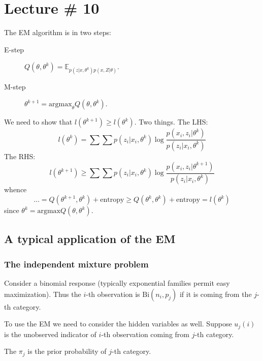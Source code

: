 \documentclass[a4paper]{article}
\newcommand{\brac}[1]{{\left ( #1 \right )}}
\newcommand{\Ex}[0]{{\mathbb{E}}}
\begin{document}




\clearpage
\section{Lecture \# 10} %
\label{sec:lecture_10}

The EM algorithm is in two steps: \begin{description}
	\item[E-step] $Q\brac{\theta, \theta^k} = \Ex_{p(z\lvert x, \theta^k) p(x,Z\lvert \theta)}$.
	\item[M-step] $\theta^{k+1}=\text{argmax}_{\theta} Q\brac{\theta, \theta^k}$.
\end{description}

We need to show that $l(\theta^{k+1})\geq l(\theta^k)$. Two things. The LHS:
\[l(\theta^k) = \sum \sum p(z_i\lvert x_i,\theta^k) \log\frac{p(x_i,z_i\lvert\theta^k)}{p(z_i\lvert x_i,\theta^k)}\]
The RHS:
\[l(\theta^{k+1}) \geq \sum \sum p(z_i\lvert x_i,\theta^k) \log\frac{p(x_i,z_i\lvert\theta^{k+1})}{p(z_i\lvert x_i,\theta^k)}\]
whence 
\[\ldots = Q(\theta^{k+1}, \theta^k) + \text{entropy}\geq Q(\theta^k, \theta^k) + \text{entropy} = l(\theta^k)\]
since $\theta^k = \text{argmax}Q(\theta, \theta^k)$.

\subsection{A typical application of the EM} %
\label{sub:a_typical_application_of_the_em}

\subsubsection{The independent mixture problem} %
\label{ssub:the_independent_mixture_problem}
Consider a binomial response (typically exponential families permit easy maximization). 
Thus the $i$-th observation is $\text{Bi}(n_i, p_j)$ if it is coming from the $j$-th category.

To use the EM we need to consider the hidden variables as well. Suppose $u_j(i)$ is the unobserved
indicator of $i$-th observation coming from $j$-th category.

The $\pi_j$ is the prior probability of $j$-th category.
\end{document}
